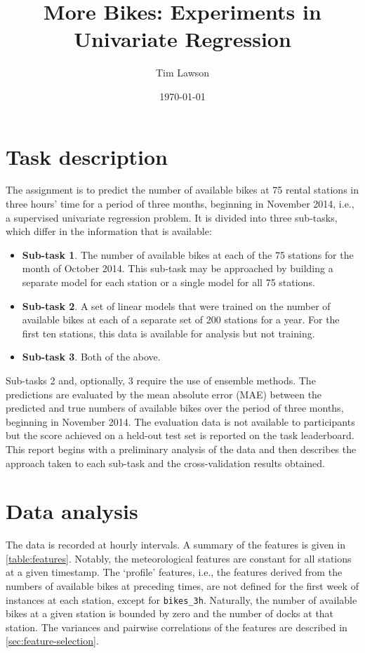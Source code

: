 \documentclass[11pt]{extarticle}
\begin{document}
\title{More Bikes: Experiments in Univariate Regression}
\author{Tim Lawson}
\date{\today}

\maketitle

\section{Task description}

The assignment is to predict the number of available bikes at 75 rental stations in
three hours' time for a period of three months, beginning in November 2014, i.e., a
supervised univariate regression problem.
It is divided into three sub-tasks, which differ in the information that is available:
\begin{itemize}
  \item \textbf{Sub-task 1}.
        The number of available bikes at each of the 75 stations for the month of October 2014.
        This sub-task may be approached by building a separate model for each station or a
        single model for all 75 stations.
  \item \textbf{Sub-task 2}.
        A set of linear models that were trained on the number of available bikes at each of a
        separate set of 200 stations for a year.
        For the first ten stations, this data is available for analysis but not training.
  \item \textbf{Sub-task 3}.
        Both of the above.
\end{itemize}
Sub-tasks 2 and, optionally, 3 require the use of ensemble methods.
The predictions are evaluated by the mean absolute error (MAE) between the predicted
and true numbers of available bikes over the period of three months, beginning in
November 2014.
The evaluation data is not available to participants but the score achieved on a
held-out test set is reported on the task leaderboard.
This report begins with a preliminary analysis of the data and then describes the
approach taken to each sub-task and the cross-validation results obtained.

\section{Data analysis}
\label{sec:data-analysis}

The data is recorded at hourly intervals.
A summary of the features is given in \cref{table:features}.
Notably, the meteorological features are constant for all stations at a given timestamp.
The `profile' features, i.e., the features derived from the numbers of available bikes
at preceding times, are not defined for the first week of instances at each station,
except for \texttt{bikes\_3h}.
Naturally, the number of available bikes at a given station is bounded by zero and the
number of docks at that station.
The variances and pairwise correlations of the features are described in
\cref{sec:feature-selection}.
\end{document}
